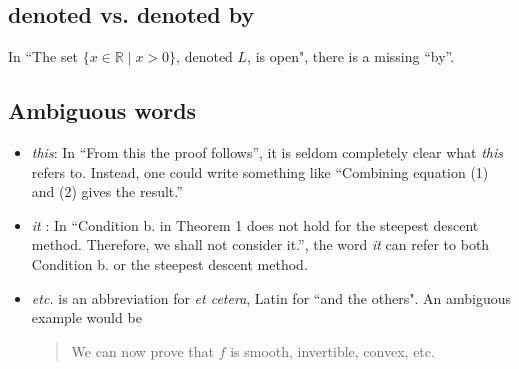 \subsection{denoted vs. denoted by}
In ``The set $\{x\in \mathbb{R}\mid x>0\}$, denoted $L$, is open", there is a
missing ``by''.

\subsection{Ambiguous words}
\begin{itemize}
\item \emph{this}: In ``From this the proof follows'', it is seldom completely clear what
\emph{this} refers to. Instead, one could write something like
``Combining equation (1) and (2) gives the result.''
\item \emph{it} \cite{higham}: In ``Condition b. in Theorem 1 does not hold for the
steepest descent method. Therefore, we shall not consider it.'',
the word \emph{it} can refer to both Condition b. or the steepest descent method.
\item \emph{etc.} is an abbreviation for \emph{et cetera}, Latin for ``and the others".
An ambiguous example would be
\begin{quote}
We can now prove that $f$ is smooth, invertible, convex, etc.
\end{quote}
\end{itemize}

